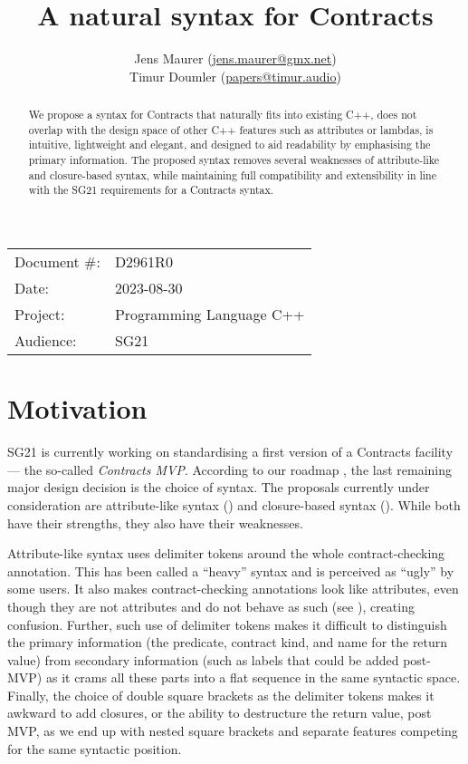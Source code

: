 


\title{A natural syntax for Contracts}
\author{ Jens Maurer \small(\href{mailto:jens.maurer@gmx.net}{jens.maurer@gmx.net}) \\
 Timur Doumler \small(\href{mailto:papers@timur.audio}{papers@timur.audio})}
\date{}
\maketitle

\begin{tabular}{ll}
Document \#: & D2961R0 \\
Date: &2023-08-30 \\
Project: & Programming Language C++ \\
Audience: & SG21
\end{tabular}

\begin{abstract}
We propose a syntax for Contracts that naturally fits into existing C++, does not overlap with the design space of other C++ features such as attributes or lambdas, is intuitive, lightweight and elegant, and designed to aid readability by emphasising the primary information. The proposed syntax removes several weaknesses of attribute-like and closure-based syntax, while maintaining full compatibility and extensibility in line with the SG21 requirements for a Contracts syntax.
\end{abstract}

\section{Motivation}
\label{sec:motivation}

SG21 is currently working on standardising a first version of a Contracts facility --- the so-called \emph{Contracts MVP}. According to our roadmap \cite{P2695R1}, the last remaining major design decision is the choice of syntax. The proposals currently under consideration are attribute-like syntax (\cite{P2935R0}) and closure-based syntax (\cite{P2461R1}). While both have their strengths, they also have their weaknesses.

Attribute-like syntax uses \tcode{[[ ... ]]} delimiter tokens around the whole contract-checking annotation. This has been called a ``heavy'' syntax and is  perceived as ``ugly'' by some users. It also makes contract-checking annotations look like attributes, even though they are not attributes and do not behave as such (see \cite{P2487R1}), creating confusion. Further, such use of delimiter tokens makes it difficult to distinguish the primary information (the predicate, contract kind, and name for the return value) from secondary information (such as labels that could be added post-MVP) as it crams all these parts into a flat sequence in the same syntactic space. Finally, the choice of double square brackets as the delimiter tokens makes it awkward to add closures, or the ability to destructure the return value, post MVP, as we end up with nested square brackets and separate features competing for the same syntactic position.

